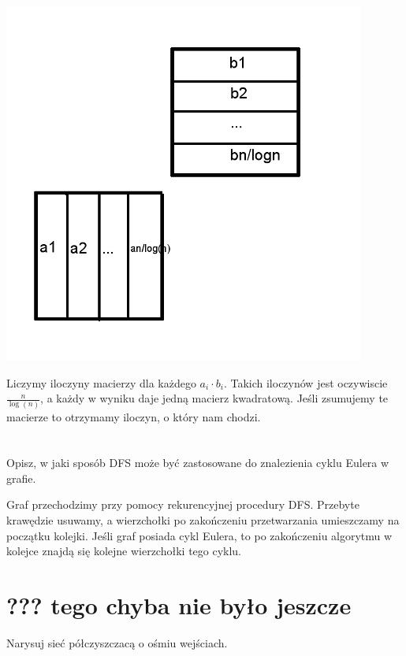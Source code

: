 \documentclass[svgnames]{report}
\begin{document}
\includegraphics[scale=0.55]{images/17.png}

Liczymy iloczyny macierzy dla każdego $a_i \cdot b_i$. Takich iloczynów jest oczywiscie $\frac{n}{\log(n)}$, 
a każdy w wyniku daje jedną macierz kwadratową. Jeśli zsumujemy te macierze to otrzymamy iloczyn, o który nam chodzi.

\section{}
\begin{framed}
Opisz, w jaki sposób DFS może być zastosowane do znalezienia cyklu Eulera w grafie.
\end{framed}

Graf przechodzimy przy pomocy rekurencyjnej procedury DFS. Przebyte krawędzie usuwamy, a wierzchołki po zakończeniu przetwarzania umieszczamy na początku kolejki. Jeśli graf posiada cykl Eulera, to po zakończeniu algorytmu w kolejce znajdą się kolejne wierzchołki tego cyklu.


\section{??? tego chyba nie było jeszcze}
\begin{framed}
Narysuj sieć półczyszczacą o ośmiu wejściach.
\end{framed}
\end{document}
